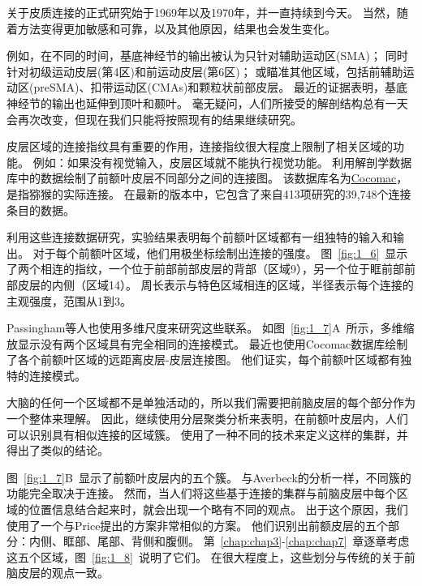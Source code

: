 关于皮质连接的正式研究始于1969年\cite{pandya1969cortico}以及1970年\cite{jones1970anatomical}，并一直持续到今天。
当然，随着方法变得更加敏感和可靠，以及其他原因，结果也会发生变化。
\par
例如，在不同的时间，基底神经节的输出被认为只针对辅助运动区(SMA)\cite{schell1984origin}；
同时针对初级运动皮层(第4区)和前运动皮层(第6区)\cite{kemp1971connexions}；
或瞄准其他区域，包括前辅助运动区(preSMA)、扣带运动区(CMAs)和颗粒状前部皮层\cite{matelli1996thalamic,mcfarland2002thalamic}。
最近的证据表明，基底神经节的输出也延伸到顶叶\cite{clower2005basal}和颞叶\cite{middleton1996temporal}。
毫无疑问，人们所接受的解剖结构总有一天会再次改变，但现在我们只能将按照现有的结果继续研究。
\par
皮层区域的连接指纹具有重要的作用，连接指纹很大程度上限制了相关区域的功能。
例如：如果没有视觉输入，皮层区域就不能执行视觉功能。
利用解剖学数据库中的数据绘制了前额叶皮层不同部分之间的连接图\cite{2002Dorsal}。
该数据库名为\href{http://www.cocomac.org/}{Cocomac}，是指猕猴的实际连接。
在最新的版本中，它包含了来自413项研究的39,748个连接条目的数据。
\par
利用这些连接数据研究\cite{2002Dorsal}，实验结果表明每个前额叶区域都有一组独特的输入和输出。
对于每个前额叶区域，他们用极坐标绘制出连接的强度。
图~\ref{fig:1_6}~显示了两个相连的指纹，一个位于前部前部皮层的背部（区域9），另一个位于眶前部前部皮层的内侧（区域14）。 
周长表示与特色区域相连的区域，半径表示每个连接的主观强度，范围从1到3。

\par
Passingham等人也使用多维尺度来研究这些联系\cite{2002Dorsal}。
如图~\ref{fig:1_7}A~所示，多维缩放显示没有两个区域具有完全相同的连接模式。
最近也使用Cocomac数据库绘制了各个前额叶区域的远距离皮层-皮层连接图\cite{averbeck2008statistical}。
他们证实，每个前额叶区域都有独特的连接模式。


\par
大脑的任何一个区域都不是单独活动的，所以我们需要把前脑皮层的每个部分作为一个整体来理解。
因此，继续使用分层聚类分析来表明\cite{2002Dorsal}，在前额叶皮层内，人们可以识别具有相似连接的区域簇。
使用了一种不同的技术来定义这样的集群，并得出了类似的结论\cite{averbeck2008statistical}。


\par
图~\ref{fig:1_7}B~显示了前额叶皮层内的五个簇\cite{2002Dorsal}。
与Averbeck\cite{averbeck2008statistical}的分析一样，不同簇的功能完全取决于连接。
然而，当人们将这些基于连接的集群与前脑皮层中每个区域的位置信息结合起来时，就会出现一个略有不同的观点。
出于这个原因，我们使用了一个与Price\cite{price2010neurocircuitry}提出的方案非常相似的方案。
他们识别出前额皮层的五个部分：内侧、眶部、尾部、背侧和腹侧。
第~\ref{chap:chap3}-\ref{chap:chap7}~章逐章考虑这五个区域，图~\ref{fig:1_8}~说明了它们。
在很大程度上，这些划分与传统的关于前脑皮层的观点一致。



